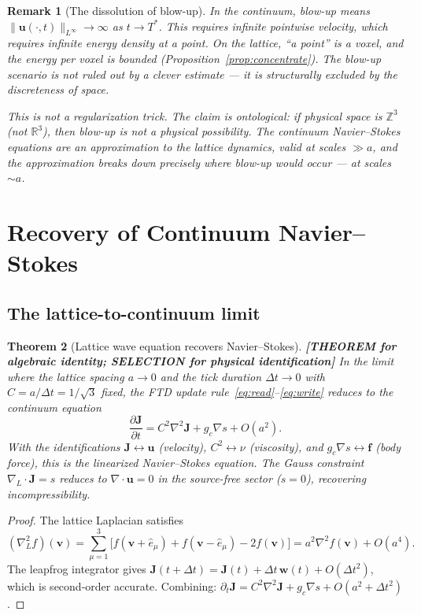 \documentclass[11pt]{article}
\theoremstyle{tight}
\newtheorem{theorem}{Theorem}[section]
\theoremstyle{plainroman}
\newtheorem{remark}[theorem]{Remark}
\newcommand{\R}{\mathbb{R}}
\newcommand{\Z}{\mathbb{Z}}
\begin{document}
\begin{remark}[The dissolution of blow-up]
In the continuum, blow-up means $\|\mathbf u(\cdot,t)\|_{L^\infty}\to\infty$ as $t\to T^*$.
This requires infinite pointwise velocity, which requires infinite energy density at a point.
On the lattice, ``a point'' is a voxel, and the energy per voxel is bounded (Proposition~\ref{prop:concentrate}).
The blow-up scenario is not ruled out by a clever estimate --- it is structurally excluded by the discreteness of space.

This is not a regularization trick.
The claim is ontological: if physical space is $\Z^3$ (not $\R^3$), then blow-up is not a physical possibility.
The continuum Navier--Stokes equations are an \emph{approximation} to the lattice dynamics, valid at scales $\gg a$, and the approximation breaks down precisely where blow-up would occur --- at scales $\sim a$.
\end{remark}

\section{Recovery of Continuum Navier--Stokes}

\subsection{The lattice-to-continuum limit}

\begin{theorem}[Lattice wave equation recovers Navier--Stokes]\label{thm:recovery}
\textbf{[THEOREM for algebraic identity; SELECTION for physical identification]}
In the limit where the lattice spacing $a\to 0$ and the tick duration $\Delta t\to 0$ with $C=a/\Delta t=1/\sqrt{3}$ fixed, the FTD update rule~\eqref{eq:read}--\eqref{eq:write} reduces to the continuum equation
\begin{equation}\label{eq:continuum}
\frac{\partial\mathbf J}{\partial t}=C^2\nabla^2\mathbf J+g_c\nabla s+O(a^2).
\end{equation}
With the identifications $\mathbf J\leftrightarrow\mathbf u$ (velocity), $C^2\leftrightarrow\nu$ (viscosity), and $g_c\nabla s\leftrightarrow\mathbf f$ (body force), this is the linearized Navier--Stokes equation.
The Gauss constraint $\nabla_L\!\cdot\!\mathbf J=s$ reduces to $\nabla\!\cdot\!\mathbf u=0$ in the source-free sector ($s=0$), recovering incompressibility.
\end{theorem}
\begin{proof}
The lattice Laplacian satisfies
\[
(\nabla_L^2 f)(\mathbf v)=\sum_{\mu=1}^3\bigl[f(\mathbf v+\hat e_\mu)+f(\mathbf v-\hat e_\mu)-2f(\mathbf v)\bigr]=a^2\nabla^2 f(\mathbf v)+O(a^4).
\]
The leapfrog integrator gives $\mathbf J(t+\Delta t)=\mathbf J(t)+\Delta t\,\mathbf w(t)+O(\Delta t^2)$, which is second-order accurate.
Combining: $\partial_t\mathbf J=C^2\nabla^2\mathbf J+g_c\nabla s+O(a^2+\Delta t^2)$.
\end{proof}
\end{document}
